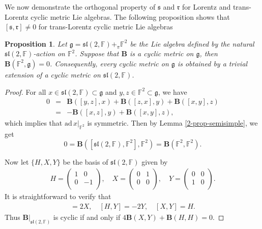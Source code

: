 \documentclass[reqno]{amsart}
\newtheorem{prop}[thm]{Proposition}
\theoremstyle{definition}
\begin{document}
We now demonstrate the orthogonal property of $\mathfrak{s}$ and $\mathfrak{r}$ for Lorentz and trans-Lorentz cyclic metric  Lie algebras.
The following proposition shows that $[\mathfrak{s},\mathfrak{r}]\neq 0$ for trans-Lorentz cyclic metric Lie algebras
\begin{prop}\label{2-lem-sl(2)}
Let $\mathfrak{g}=\mathfrak{sl}(2,\mathbb{F})+_{\pi}\mathbb{F}^{2}$ be the  Lie algebra defined by the natural $\mathfrak{sl}(2,\mathbb{F})$-action on $\mathbb{F}^{2}$. Suppose that $\mathbf{B}$ is a cyclic metric on  $\mathfrak{g}$, then $\mathbf{B}(\mathbb{F}^{2},\mathfrak{g})=0$.
Consequently, every cyclic metric on $\mathfrak{g}$ is obtained by a trivial extension of a cyclic metric on
$\mathfrak{sl}(2,\mathbb{F})$.
\end{prop}
\begin{proof}
For all $x\in \mathfrak{sl}(2,\mathbb{F})\subset \mathfrak{g}$ and $y,z\in \mathbb{F}^{2}\subset \mathfrak{g}$, we have
\begin{eqnarray*}
0&=&\mathbf{B}([y,z],x)+\mathbf{B}([z,x],y)+\mathbf{B}([x,y],z)\\
 &=&-\mathbf{B}([x,z],y)+\mathbf{B}([x,y],z),
\end{eqnarray*}
which implies that $\mathrm{ad}\, x|_{\mathbb{F}^{2}}$ is symmetric. Then by Lemma \ref{2-prop-semisimple}, we get
$$0=\mathbf{B}([\mathfrak{sl}(2,\mathbb{F}),\mathbb{F}^{2}],\mathbb{F}^{2})
=\mathbf{B}(\mathbb{F}^{2},\mathbb{F}^{2}).$$

Now let $\{H,X,Y\}$ be the basis of $\mathfrak{sl}(2,\mathbb{F})$ given by
\begin{eqnarray*}
H=\left(
                  \begin{array}{cc}
                    1 & 0 \\
                    0 & -1 \\
                  \end{array}
                \right),\quad
 X=\left(
            \begin{array}{cc}
              0 & 1 \\
              0 & 0 \\
            \end{array}
          \right),\quad
 Y=\left(
            \begin{array}{cc}
              0 & 0 \\
              1 & 0 \\
            \end{array}
          \right).
\end{eqnarray*}
It is straightforward to verify that
\begin{eqnarray*}
[H,X]=2X,\quad [H,Y]=-2Y,\quad [X,Y]=H.
\end{eqnarray*}
Thus $\mathbf{B}|_{\mathfrak{sl}(2,\mathbb{F})}$ is cyclic if and only if $4\mathbf{B}(X,Y)+\mathbf{B}(H,H)=0$.


\end{proof}
\end{document}
